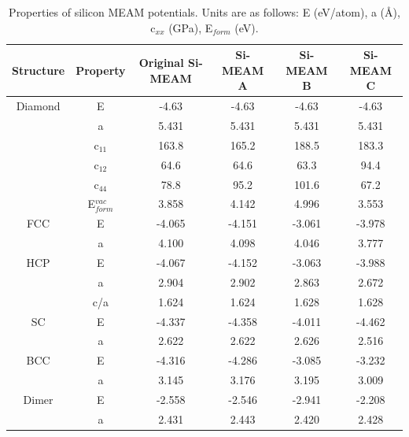 \documentclass[review]{elsarticle}
\begin{document}
\begin{table}[h]
\caption{Properties of silicon MEAM potentials.  Units are as follows: E (eV/atom), a (\AA), c$_{xx}$ (GPa), E$_{form}$ (eV).     }\label{tab:ben2}
\begin{center}
\begin{tabular}{|c|c|c|c|c|c|}
     \hline
     Structure & Property & Original Si-MEAM  & Si-MEAM A & Si-MEAM B & Si-MEAM C\\
     \hline
     Diamond & E & -4.63 & -4.63 & -4.63 & -4.63\\
     & a & 5.431 & 5.431 & 5.431 & 5.431\\
     & c$_{11}$ & 163.8 & 165.2 & 188.5 & 183.3\\
    & c$_{12}$  & 64.6 &	64.6  & 63.3 & 94.4\\
 & c$_{44}$ & 78.8	& 95.2 & 101.6 & 67.2\\
& E$_{form}^{vac}$ &3.858 & 4.142 & 4.996 & 3.553\\
    \hline
FCC & E &-4.065 &	-4.151 & -3.061 & -3.978\\
& a & 4.100 &	4.098 & 4.046 & 3.777\\
    \hline
HCP &  E &-4.067 &	-4.152 & -3.063 & -3.988 \\
& a & 2.904 &	2.902 & 2.863 & 2.672\\
& c/a & 1.624 &	1.624 & 1.628 & 1.628\\ 
    \hline
SC & E & -4.337 &	-4.358 & -4.011 & -4.462\\
& a &2.622 &	2.622 & 2.626 & 2.516\\
    \hline
BCC & E & -4.316 &	-4.286 & -3.085 & -3.232\\
& a & 3.145 &	3.176 & 3.195 & 3.009\\
    \hline
Dimer & E & -2.558 &	-2.546 & -2.941 & -2.208\\
& a & 2.431 &	2.443 & 2.420 & 2.428\\
           \hline
\end{tabular}
\end{center}
\label{default}
\end{table}%
\end{document}
